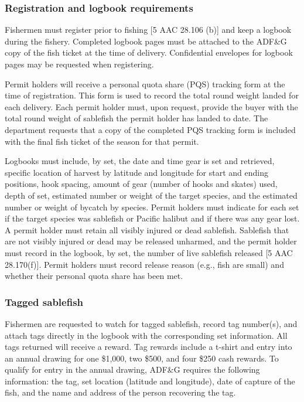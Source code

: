\documentclass[
]{article}
\begin{document}
\hypertarget{registration-and-logbook-requirements}{%
\subsubsection{Registration and logbook requirements}\label{registration-and-logbook-requirements}}

Fishermen must register prior to fishing {[}5 AAC 28.106 (b){]} and keep a logbook during the fishery. Completed logbook pages must be attached to the ADF\&G copy of the fish ticket at the time of delivery. Confidential envelopes for logbook pages may be requested when registering.

Permit holders will receive a personal quota share (PQS) tracking form at the time of registration. This form is used to record the total round weight landed for each delivery. Each permit holder must, upon request, provide the buyer with the total round weight of sablefish the permit holder has landed to date. The department requests that a copy of the completed PQS tracking form is included with the final fish ticket of the season for that permit.

Logbooks must include, by set, the date and time gear is set and retrieved, specific location of harvest by latitude and longitude for start and ending positions, hook spacing, amount of gear (number of hooks and skates) used, depth of set, estimated number or weight of the target species, and the estimated number or weight of bycatch by species. Permit holders must indicate for each set if the target species was sablefish or Pacific halibut and if there was any gear lost. A permit holder must retain all visibly injured or dead sablefish. Sablefish that are not visibly injured or dead may be released unharmed, and the permit holder must record in the logbook, by set, the number of live sablefish released {[}5 AAC 28.170(f){]}. Permit holders must record release reason (e.g., fish are small) and whether their personal quota share has been met.

\hypertarget{tagged-sablefish}{%
\subsubsection{Tagged sablefish}\label{tagged-sablefish}}

Fishermen are requested to watch for tagged sablefish, record tag number(s), and attach tags directly in the logbook with the corresponding set information. All tags returned will receive a reward. Tag rewards include a t-shirt and entry into an annual drawing for one \$1,000, two \$500, and four \$250 cash rewards. To qualify for entry in the annual drawing, ADF\&G requires the following information: the tag, set location (latitude and longitude), date of capture of the fish, and the name and address of the person recovering the tag.
\end{document}
